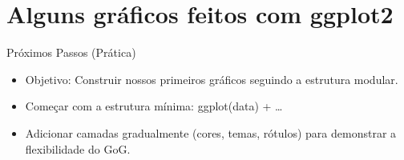 \documentclass[
  ignorenonframetext,
  serif,
  professionalfont,
  usenames,
  dvipsnames,
  aspectratio = 169]{beamer}
\begin{document}
\section{Alguns gráficos feitos com
ggplot2}\label{alguns-gruxe1ficos-feitos-com-ggplot2}

\begin{frame}{Próximos Passos (Prática)}
\label{pruxf3ximos-passos-pruxe1tica}
\begin{itemize}
\item
  Objetivo: Construir nossos primeiros gráficos seguindo a estrutura
  modular.
\item
  Começar com a estrutura mínima: ggplot(data) + \ldots{}
\item
  Adicionar camadas gradualmente (cores, temas, rótulos) para demonstrar
  a flexibilidade do GoG.
\end{itemize}
\end{frame}
\end{document}
